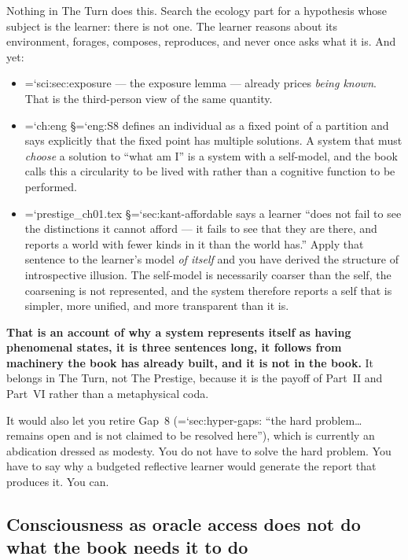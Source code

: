 \documentclass[11pt,letterpaper]{article}
\newcommand{\loc}[1]{{\small\ttfamily\color{accent}\hyphenchar\font=`\-\relax #1}}
\newcommand{\fnd}[1]{\textbf{\color{warn}#1}}
\begin{document}
Nothing in The Turn does this. Search the ecology part for a hypothesis
whose subject is the learner: there is not one. The learner reasons
about its environment, forages, composes, reproduces, and never once
asks what it is. And yet:

\begin{itemize}[leftmargin=1.2em,itemsep=3pt]
\item \loc{sci:sec:exposure} --- the exposure lemma --- already prices
      \emph{being known}. That is the third-person view of the same
      quantity.
\item \loc{ch:eng} \S\loc{eng:S8} defines an individual as a fixed
      point of a partition and says explicitly that the fixed point has
      multiple solutions. A system that must \emph{choose} a solution
      to ``what am I'' is a system with a self-model, and the book
      calls this a circularity to be lived with rather than a
      cognitive function to be performed.
\item \loc{prestige\_ch01.tex} \S\loc{sec:kant-affordable} says a
      learner ``does not fail to see the distinctions it cannot afford
      --- it fails to see that they are there, and reports a world with
      fewer kinds in it than the world has.'' Apply that sentence to
      the learner's model \emph{of itself} and you have derived the
      structure of introspective illusion. The self-model is
      necessarily coarser than the self, the coarsening is not
      represented, and the system therefore reports a self that is
      simpler, more unified, and more transparent than it is.
\end{itemize}

\fnd{That is an account of why a system represents itself as having
phenomenal states, it is three sentences long, it follows from
machinery the book has already built, and it is not in the book.} It
belongs in The Turn, not The Prestige, because it is the payoff of
Part~II and Part~VI rather than a metaphysical coda.

It would also let you retire Gap~8 (\loc{sec:hyper-gaps}: ``the hard
problem\ldots{} remains open and is not claimed to be resolved here''),
which is currently an abdication dressed as modesty. You do not have to
solve the hard problem. You have to say why a budgeted reflective
learner would generate the report that produces it. You can.

\subsection*{Consciousness as oracle access does not do what the book
needs it to do}
\end{document}
